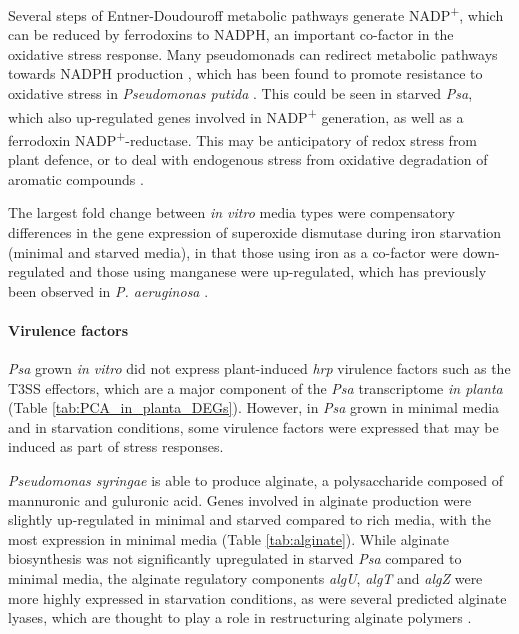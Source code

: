 Several steps of Entner-Doudouroff metabolic pathways generate NADP\textsuperscript{+}, which can be reduced by ferrodoxins to NADPH, an important co-factor in the oxidative stress response. Many pseudomonads can redirect metabolic pathways towards NADPH production \citep{Kivisaar_2018}, which has been found to promote resistance to oxidative stress in \textit{Pseudomonas putida} \citep{Chavarria_Nikel_Perez-Pantoja_de_Lorenzo_2013}. This could be seen in starved \textit{Psa}, which also up-regulated genes involved in NADP\textsuperscript{+} generation, as well as a ferrodoxin NADP\textsuperscript{+}-reductase. This may be anticipatory of redox stress from plant defence, or to deal with endogenous stress from oxidative degradation of aromatic compounds \citep{Kivisaar_2018}.

The largest fold change between \textit{in vitro} media types were compensatory differences in the gene expression of superoxide dismutase during iron starvation (minimal and starved media), in that those using iron as a co-factor were down-regulated and those using manganese were up-regulated, which has previously been observed in \textit{P. aeruginosa} \citep{Vasil_Ochsner_1999}.

\paragraph{Virulence factors}
\textit{Psa} grown \textit{in vitro} did not express plant-induced \textit{hrp} virulence factors such as the T3SS effectors, which are a major component of the \textit{Psa} transcriptome \textit{in planta} \citep{McAtee2018-sl} (Table \ref{tab:PCA_in_planta_DEGs}). However, in \textit{Psa} grown in minimal media and in starvation conditions, some virulence factors were expressed that may be induced as part of stress responses. 

\textit{Pseudomonas syringae} is able to produce alginate, a polysaccharide composed of mannuronic and guluronic acid. Genes involved in alginate production were slightly up-regulated in minimal and starved compared to rich media, with the most expression in minimal media (Table \ref{tab:alginate}). 
While alginate biosynthesis was not significantly upregulated in starved \textit{Psa} compared to minimal media, the alginate regulatory components \textit{algU}, \textit{algT} and \textit{algZ} were more highly expressed in starvation conditions, as were several predicted alginate lyases, which are thought to play a role in restructuring alginate polymers \citep{Preston2000-xn}. 

